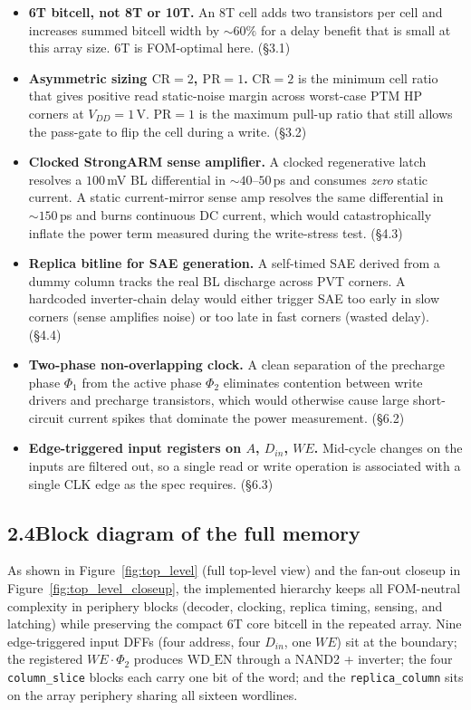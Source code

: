 \documentclass[11pt]{article}
\newcommand{\Subsect}[1]{\subsection*{#1}\addcontentsline{toc}{subsection}{#1}}
\begin{document}
\begin{itemize}
\item \textbf{6T bitcell, not 8T or 10T.} An 8T cell adds two
  transistors per cell and increases summed bitcell width by
  $\sim 60\%$ for a delay benefit that is small at this array size.
  6T is FOM-optimal here. (\S 3.1)
\item \textbf{Asymmetric sizing $\mathrm{CR}=2$, $\mathrm{PR}=1$.}
  $\mathrm{CR}=2$ is the minimum cell ratio that gives positive read
  static-noise margin across worst-case PTM HP corners at $V_{DD}=1\,$V.
  $\mathrm{PR}=1$ is the maximum pull-up ratio that still allows the
  pass-gate to flip the cell during a write. (\S 3.2)
\item \textbf{Clocked StrongARM sense amplifier.} A clocked
  regenerative latch resolves a $100$\,mV BL differential in
  $\sim 40$--$50$\,ps and consumes \emph{zero} static current. A static
  current-mirror sense amp resolves the same differential in
  $\sim 150$\,ps and burns continuous DC current, which would
  catastrophically inflate the power term measured during the
  write-stress test. (\S 4.3)
\item \textbf{Replica bitline for SAE generation.} A self-timed SAE
  derived from a dummy column tracks the real BL discharge across PVT
  corners. A hardcoded inverter-chain delay would either trigger SAE
  too early in slow corners (sense amplifies noise) or too late in
  fast corners (wasted delay). (\S 4.4)
\item \textbf{Two-phase non-overlapping clock.} A clean separation of
  the precharge phase $\Phi_1$ from the active phase $\Phi_2$
  eliminates contention between write drivers and precharge
  transistors, which would otherwise cause large short-circuit current
  spikes that dominate the power measurement. (\S 6.2)
\item \textbf{Edge-triggered input registers on $A$, $D_{in}$, $WE$.}
  Mid-cycle changes on the inputs are filtered out, so a single
  read or write operation is associated with a single CLK edge as the
  spec requires. (\S 6.3)
\end{itemize}

\Subsect{2.4\quad Block diagram of the full memory}

As shown in Figure~\ref{fig:top_level} (full top-level view) and the
fan-out closeup in Figure~\ref{fig:top_level_closeup}, the implemented
hierarchy keeps all FOM-neutral complexity in periphery blocks
(decoder, clocking, replica timing, sensing, and latching) while
preserving the compact 6T core bitcell in the repeated array. Nine
edge-triggered input DFFs (four address, four $D_{in}$, one $WE$) sit
at the boundary; the registered $WE\!\cdot\!\Phi_2$ produces
$\mathrm{WD\_EN}$ through a NAND2 + inverter; the four
\texttt{column\_slice} blocks each carry one bit of the word; and the
\texttt{replica\_column} sits on the array periphery sharing all
sixteen wordlines.
\end{document}
